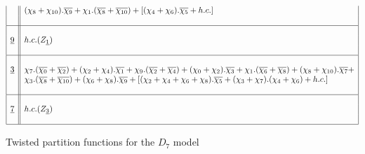 \documentclass[a4paper,11pt]{article}
\newcommand{\ch}[1]{\chi_{#1}}
\newcommand{\och}[1]{\overline{\chi_{#1}}}
\newcommand{\ud}[1]{\underline{#1}}
\begin{document}
\begin{table}
$$\begin{array}{|c||l|}
{}  & (\ch{8} + \ch{10}).\och{9} + \ch{1}.(\och{8} + \och{10})+
      [(\ch{4} + \ch{6}).\och{5} + h.c.] \\
{}  &  {}  \\
\hline
{}  &  {}  \\
\ud9  &  h.c.(Z_{\ud1})  \\
{}  &  {}  \\
\hline
{}  &  {}  \\
\ud3  &  \ch{7}.(\och{0} + \och{2}) + (\ch{2} + \ch{4}).\och{1} +
          \ch{9}.(\och{2} + \och{4})+ (\ch{0} + \ch{2}).\och{3} +
          \ch{1}.(\och{6} + \och{8}) + (\ch{8} + \ch{10}).\och{7}+ \\
{}  &  \ch{3}.(\och{8} + \och{10}) + (\ch{6} + \ch{8}).\och{9} +
          [(\ch{2} + \ch{4} + \ch{6} + \ch{8}).\och{5} +
           (\ch{3} + \ch{7}).(\ch{4} + \ch{6}) + h.c.] \\
{}  &  {}  \\
\hline
{}  &  {}  \\
\ud7  &  h.c.(Z_{\ud3})  \\
{}  &  {}  \\
\hline
\end{array}
$$
\normalsize
\caption{Twisted partition functions for the $D_7$ model}
\end{table}




\end{document}
